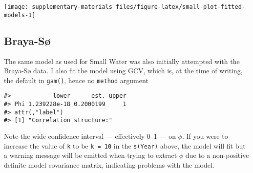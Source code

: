 \documentclass[12pt,]{article}
\newenvironment{Shaded}{\begin{snugshade}}{\end{snugshade}}
\newcommand{\CommentTok}[1]{\textcolor[rgb]{0.56,0.35,0.01}{\textit{#1}}}
\newcommand{\DataTypeTok}[1]{\textcolor[rgb]{0.13,0.29,0.53}{#1}}
\newcommand{\DecValTok}[1]{\textcolor[rgb]{0.00,0.00,0.81}{#1}}
\newcommand{\KeywordTok}[1]{\textcolor[rgb]{0.13,0.29,0.53}{\textbf{#1}}}
\newcommand{\NormalTok}[1]{#1}
\newcommand{\OperatorTok}[1]{\textcolor[rgb]{0.81,0.36,0.00}{\textbf{#1}}}
\newcommand{\StringTok}[1]{\textcolor[rgb]{0.31,0.60,0.02}{#1}}
\begin{document}
\begin{center}\texttt{[image: supplementary-materials\_files/figure-latex/small-plot-fitted-models-1]} \end{center}

\hypertarget{braya-suxf8}{%
\subsection{Braya-Sø}\label{braya-suxf8}}

The same model as used for Small Water was also initially attempted with
the Braya-Sø data. I also fit the model using GCV, which is, at the time
of writing, the default in \texttt{gam()}, hence no \texttt{method}
argument

\begin{Shaded}
\end{Shaded}

\begin{verbatim}
#>            lower      est. upper
#> Phi 1.239228e-18 0.2000199     1
#> attr(,"label")
#> [1] "Correlation structure:"
\end{verbatim}

Note the wide confidence interval --- effectively 0--1 --- on \(\phi\).
If you were to increase the value of \texttt{k} to be \texttt{k\ =\ 10}
in the \texttt{s(Year)} above, the model will fit but a warning message
will be emitted when trying to extract \(\phi\) due to a non-positive
definite model covariance matrix, indicating problems with the model.
\end{document}
